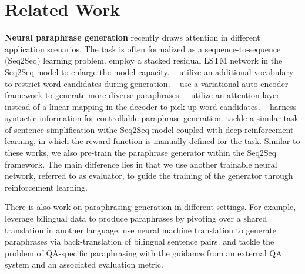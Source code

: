 \documentclass[11pt,a4paper]{article}
\begin{document}
\section{Related Work}\label{seq:relate}


    \textbf{Neural paraphrase generation} recently draws attention in different application scenarios. The task is often formalized as a sequence-to-sequence (Seq2Seq) learning problem. \citet{prakash2016neural} employ a stacked residual LSTM network in the Seq2Seq model to enlarge the model capacity. ~\citet{cao2017joint} utilize an additional vocabulary to restrict word candidates during generation. ~\citet{gupta2017deep} use a variational auto-encoder framework to generate more diverse paraphrases. ~\citet{ma2018word} utilize an attention layer instead of a linear mapping in the decoder to pick up word candidates. ~\citet{iyyer2018adversarial} harness syntactic information for controllable paraphrase generation. \citet{zhang2017sentence} tackle a similar task of sentence simplification withe Seq2Seq model coupled with deep reinforcement learning, in which the reward function is manually defined for the task. Similar to these works, we also pre-train the paraphrase generator within the Seq2Seq framework. The main difference lies in that we use another trainable neural network, referred to as evaluator, to guide the training of the generator through reinforcement learning.

    There is also work on paraphrasing generation in different settings. For example, \citet{mallinson2017paraphrasing} leverage bilingual data to produce paraphrases by pivoting over a shared translation in another language. \citet{wieting2017learning,wieting2018paranmt} use neural machine translation to generate paraphrases via back-translation of bilingual sentence pairs. \citet{buck2017ask} and \citet{dong2017learning} tackle the problem of QA-specific paraphrasing with the guidance from an external QA system and an associated evaluation metric.
\end{document}
